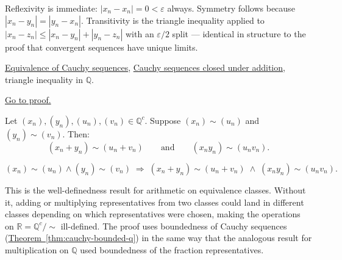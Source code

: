 \begin{remark*}[Interpretation]
Reflexivity is immediate: $|x_n - x_n| = 0 < \varepsilon$ always.
Symmetry follows because $|x_n - y_n| = |y_n - x_n|$.
Transitivity is the triangle inequality applied to $|x_n - z_n| \leq
|x_n - y_n| + |y_n - z_n|$ with an $\varepsilon/2$ split — identical in
structure to the proof that convergent sequences have unique limits.
\end{remark*}

\begin{remark*}[Dependencies]
\hyperref[def:cauchy-equivalence]{Equivalence of Cauchy sequences},
\hyperref[thm:cauchy-closed-operations-q]{Cauchy sequences closed under addition},
triangle inequality in $\mathbb{Q}$.
\end{remark*}

\begin{remark*}[Proof]
\hyperref[prf:cauchy-equivalence-is-equivalence]{Go to proof.}
\end{remark*}

\begin{theorem}
\label{thm:cauchy-equiv-preserved-operations}
Let $(x_n),(y_n),(u_n),(v_n) \in \mathbb{Q}^c$.
Suppose $(x_n) \sim (u_n)$ and $(y_n) \sim (v_n)$.  Then:
\[
(x_n + y_n) \sim (u_n + v_n)
\qquad\text{and}\qquad
(x_n y_n) \sim (u_n v_n).
\]
\end{theorem}

\begin{remark*}
\[
(x_n) \sim (u_n) \land (y_n) \sim (v_n)
\;\Longrightarrow\;
(x_n + y_n) \sim (u_n + v_n)
\;\land\;
(x_n y_n) \sim (u_n v_n).
\]
\end{remark*}

\begin{remark*}[Interpretation]
This is the well-definedness result for arithmetic on equivalence classes.
Without it, adding or multiplying representatives from two classes could
land in different classes depending on which representatives were chosen,
making the operations on $\mathbb{R} = \mathbb{Q}^c / \sim$ ill-defined.
The proof uses boundedness of Cauchy sequences (\hyperref[thm:cauchy-bounded-q]{Theorem~\ref*{thm:cauchy-bounded-q}})
in the same way that the analogous result for multiplication on $\mathbb{Q}$
used boundedness of the fraction representatives.
\end{remark*}

